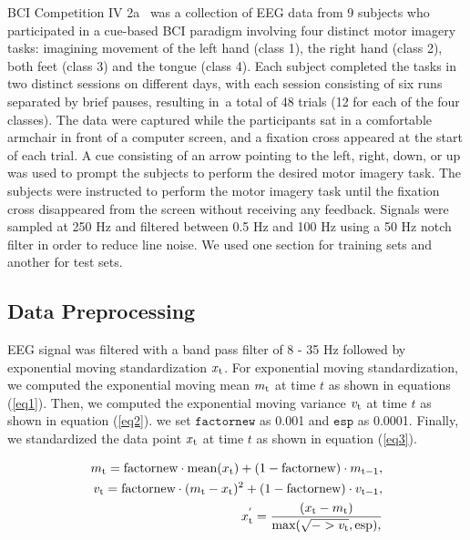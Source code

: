\documentclass[12pt]{iopart}
\begin{document}
BCI Competition IV 2a \cite{brunner2008bci} was a collection of EEG data from 9 subjects who participated in a cue-based BCI paradigm involving four distinct motor imagery tasks: imagining movement of the left hand (class 1), the right hand (class 2), both feet (class 3) and the tongue (class 4). Each subject completed the tasks in two distinct sessions on different days, with each session consisting of six runs separated by brief pauses, resulting in a total of 48 trials (12 for each of the four classes). The data were captured while the participants sat in a comfortable armchair in front of a computer screen, and a fixation cross appeared at the start of each trial. A cue consisting of an arrow pointing to the left, right, down, or up was used to prompt the subjects to perform the desired motor imagery task. The subjects were instructed to perform the motor imagery task until the fixation cross disappeared from the screen without receiving any feedback. Signals were sampled at 250 Hz and filtered between 0.5 Hz and 100 Hz using a 50 Hz notch filter in order to reduce line noise. We used one section for training sets and another for test sets.

\subsection{Data Preprocessing}
EEG signal was filtered with a band pass filter of 8 - 35 Hz followed by exponential moving standardization $x_{\rm t}$. For exponential moving standardization, we computed the exponential moving mean $m_{\rm t}$ at time $t$ as shown in equations (\ref{eq1}).
Then, we computed the exponential moving variance $v_{\rm t}$ at time $t$ as shown in equation (\ref{eq2}).
we set $\texttt{factornew}$ as 0.001 and $\texttt{esp}$ as 0.0001. Finally, we standardized the data point $x_{\rm t}$ at time $t$ as shown in equation (\ref{eq3}).

\begin{eqnarray} 
m_{\rm t} = \text{factornew} \cdot \text{mean}(x_{\rm t}) + (1 - \text{factornew}) \cdot m_{\rm t-1}, \label{eq1}\\
v_{\rm t} = \text{factornew}\cdot (m_{\rm t} - x_{\rm t})^{2} + (1 - \text{factornew}) \cdot v_{\rm t-1} , \label{eq2} \\ 
x_{\rm t}^{'}  = \frac{(x_{\rm t}-m_{\rm t})}{\text{max}(\sqrt{->v_{\rm t}},\text{esp}), \label{eq3} }
\end{eqnarray}
\end{document}
